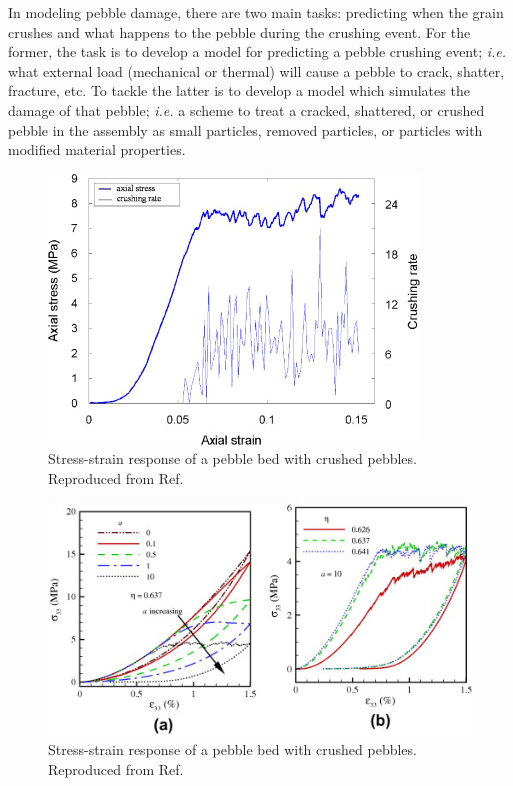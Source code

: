 In modeling pebble damage, there are two main tasks: predicting when the grain crushes and what happens to the pebble during the crushing event. For the former, the task is to develop a model for predicting a pebble crushing event; \textit{i.e.} what external load (mechanical or thermal) will cause a pebble to crack, shatter, fracture, etc. To tackle the latter is to develop a model which simulates the damage of that pebble; \textit{i.e.} a scheme to treat a cracked, shattered, or crushed pebble in the assembly as small particles, removed particles, or particles with modified material properties.

\begin{figure}[!t]
\centering
	\includegraphics[width=\singleimagewidth]{chapters/figures/markets-bolton-stress-strain-crushing.jpg}
	\caption{Stress-strain response of a pebble bed with crushed pebbles. Reproduced from Ref.~\cite{Marketos2007}}
	\label{fig:marketos-bolton-stress-strain}
\end{figure}

\begin{figure}[!t]
\centering
	\includegraphics[width=\singleimagewidth]{chapters/figures/annabattula-stress-strain-crushing.jpg}
	\caption{Stress-strain response of a pebble bed with crushed pebbles. Reproduced from Ref.~\cite{Annabattula2012a}}
	\label{fig:annabattula-stress-strain}
\end{figure}

